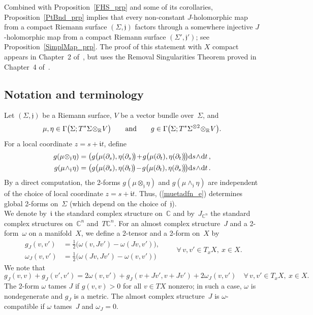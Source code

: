 \documentclass[11pt]{article}
\numberwithin{equation}{section}
\theoremstyle{definition}
\def\BE#1{\begin{equation}\label{#1}}
\def\EE{\end{equation}}
\def\eref#1{(\ref{#1})}
\def\sf#1{\textsf{#1}}
\def\C{\mathbb{C}}
\def\fI{\mathfrak i}
\def\fj{\mathfrak j}
\def\R{\mathbb R}
\def\om{\omega}
\def\Ga{\Gamma}
\def\Si{\Sigma}
\def\prt{\partial}
\def\w{\wedge}
\def\nd{\textnormal{d}}
\begin{document}
\noindent
Combined with Proposition~\ref{FHS_prp} and some of its corollaries, 
Proposition~\ref{PtBnd_prp}
 implies that every non-constant $J$-holomorphic map from a compact 
Riemann surface $(\Si,\fj)$ factors through 
a \sf{somewhere injective} $J$-holomorphic map from a compact 
Riemann surface $(\Si',\fj')$; see Proposition~\ref{SimplMap_prp}. 
The proof of this statement with $X$ compact
appears in Chapter~2 of~\cite{MS12},
but uses the Removal Singularities Theorem proved
in Chapter~4 of~\cite{MS12}.



\subsection{Notation and terminology}
\label{NotTerm_subs}

\noindent
Let $(\Si,\fj)$ be a Riemann surface, $V$ be a vector bundle over~$\Si$, and
$$\mu,\eta\in\Ga\big(\Si;T^*\Si\!\otimes_{\R}\!V\big)
\qquad\hbox{and}\qquad
g\in\Ga\big(\Si;T^*\Si^{\otimes2}\!\otimes_{\R}\!V\big).$$
For a local coordinate $z\!=\!s\!+\!\fI t$, define
\BE{muetadfn_e}\begin{split}
g(\mu\!\otimes_{\fj}\!\eta)&=
\big(g\big(\mu(\prt_s),\eta(\prt_s)\!\big)\!+\!g\big(\mu(\prt_t),\eta(\prt_t)\!\big)\!\big)
\nd s\!\w\!\nd t\,,\\
g(\mu\!\w_{\fj}\!\eta)&=\big(g\big(\mu(\prt_s),\eta(\prt_t)\!\big)\!-\!
g\big(\mu(\prt_t),\eta(\prt_s)\!\big)\!\big)
\nd s\!\w\!\nd t\,.
\end{split}\EE
By a direct computation, the 2-forms $g(\mu\!\otimes_{\fj}\!\eta)$ and $g(\mu\!\w_{\fj}\!\eta)$
are independent of the choice of local coordinate \hbox{$z\!=\!s\!+\!\fI t$}.
Thus, \eref{muetadfn_e} determines global 2-forms on~$\Si$
(which depend on the choice of~$\fj$).\\

\noindent
We denote by~$\fI$ the standard complex structure on~$\C$ and 
by~$J_{\C^n}$ the standard complex structures on~$\C^n$ and~$T\C^n$.
For an almost complex structure~$J$ and a 2-form~$\om$ on a manifold~$X$, we define
a 2-tensor and a 2-form on~$X$ by
\BE{omJdfn_e}\begin{split}
g_J(v,v')&=\frac12\big(\om(v,Jv')-\om(Jv,v')\big),\\
\om_J(v,v')&=\frac12\big(\om(Jv,Jv')-\om(v,v')\big)
\end{split}
\qquad\forall\,v,v'\!\in\!T_xX,~x\!\in\!X.\EE 
We note that 
\BE{omEner_e}g_J(v,v)+g_J(v',v')=2\om(v,v')+g_J(v\!+\!Jv',v\!+\!Jv')
+2\om_J(v,v')
\quad\forall\,v,v'\!\in\!T_xX,~x\!\in\!X.\EE
The 2-form $\om$ \sf{tames} $J$ if $g(v,v)\!>\!0$ for all $v\!\in\!TX$ nonzero;
in such a case,  $\om$ is nondegenerate and $g_J$ is a metric.
The almost complex structure~$J$ is \sf{$\om$-compatible} if $\om$ tames~$J$ and 
$\om_J\!=\!0$.\\
\end{document}
